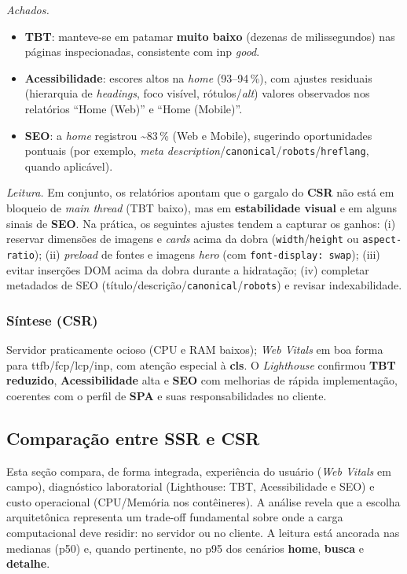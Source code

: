 \noindent \textit{Achados.}
\begin{itemize}
    \item \textbf{TBT}: manteve-se em patamar \textbf{muito baixo} (dezenas de milissegundos) nas páginas inspecionadas, consistente com \acrshort{inp} \textit{good}.
    \item \textbf{Acessibilidade}: escores altos na \emph{home} (93--94\,\%), com ajustes residuais (hierarquia de \emph{headings}, foco visível, rótulos/\textit{alt}) valores observados nos relatórios “Home (Web)” e “Home (Mobile)”.
    \item \textbf{SEO}: a \emph{home} registrou \textasciitilde{}83\,\% (Web e Mobile), sugerindo oportunidades pontuais (por exemplo, \emph{meta description}/\texttt{canonical}/\texttt{robots}/\texttt{hreflang}, quando aplicável).
\end{itemize}

\noindent \textit{Leitura.} Em conjunto, os relatórios apontam que o gargalo do \textbf{CSR} não está em bloqueio de \emph{main thread} (TBT baixo), mas em \textbf{estabilidade visual} e em alguns sinais de \textbf{SEO}. Na prática, os seguintes ajustes tendem a capturar os ganhos: (i) reservar dimensões de imagens e \emph{cards} acima da dobra (\texttt{width}/\texttt{height} ou \texttt{aspect-ratio}); (ii) \emph{preload} de fontes e imagens \emph{hero} (com \texttt{font-display: swap}); (iii) evitar inserções DOM acima da dobra durante a hidratação; (iv) completar metadados de SEO (título/descrição/\texttt{canonical}/\texttt{robots}) e revisar indexabilidade.

\subsubsection*{Síntese (CSR)}
Servidor praticamente ocioso (CPU e RAM baixos); \emph{Web Vitals} em boa forma para \acrshort{ttfb}/\acrshort{fcp}/\acrshort{lcp}/\acrshort{inp}, com atenção especial à \textbf{\acrshort{cls}}. O \emph{Lighthouse} confirmou \textbf{TBT reduzido}, \textbf{Acessibilidade} alta e \textbf{SEO} com melhorias de rápida implementação, coerentes com o perfil de \textbf{SPA} e suas responsabilidades no cliente.

\subsection{Comparação entre SSR e CSR}
\label{subsec:comparacao-ssr-csr}

Esta seção compara, de forma integrada, experiência do usuário (\emph{Web Vitals} em campo), diagnóstico laboratorial (Lighthouse: TBT, Acessibilidade e SEO) e custo operacional (CPU/Memória nos contêineres). A análise revela que a escolha arquitetônica representa um trade-off fundamental sobre onde a carga computacional deve residir: no servidor ou no cliente. A leitura está ancorada nas medianas (p50) e, quando pertinente, no p95 dos cenários \textbf{home}, \textbf{busca} e \textbf{detalhe}.


